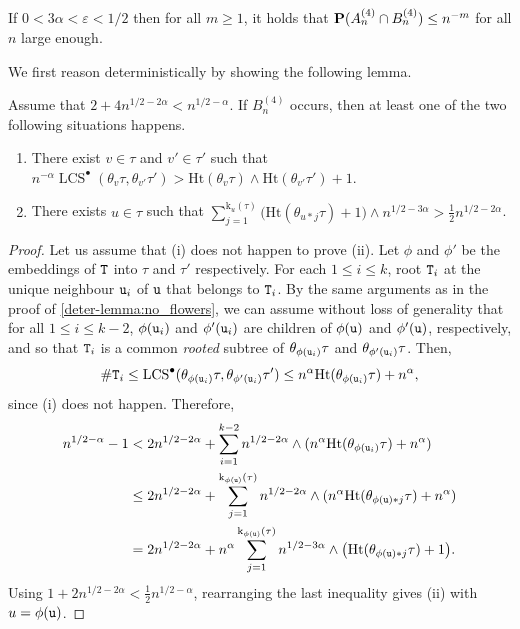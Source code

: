\documentclass[11pt,reqno]{amsart}
\newcommand{\Ht}{\mathrm{Ht}}
\newcommand{\rk}{\mathrm{k}}
\newcommand{\LCS}{\operatorname{LCS}}
\begin{document}
\begin{prop}
\label{prop:no_bushes}
If $0<3\alpha<\varepsilon<1/2$ then for all $m\geq1$, it holds that $\P(A_n^{(4)}\cap B_n^{(4)})\leq n^{-m}$ for all $n$ large enough.
\end{prop}

We first reason deterministically by showing the following lemma.

\begin{lem}
\label{deter-lemma:no_bushes}
Assume that $2+4n^{1/2-2\alpha}<n^{1/2-\alpha}$. If $B_n^{(4)}$ occurs, then at least one of the two following situations happens.
\begin{enumerate}
    \item[\emph{(i)}] There exist $v\in\tau$ and $v'\in\tau'$ such that $n^{-\alpha}\LCS^\bullet(\theta_v\tau,\theta_{v'}\tau')>\Ht(\theta_v\tau)\wedge\Ht(\theta_{v'}\tau')+1$.
    \item[\emph{(ii)}] There exists $u\in\tau$ such that $\sum_{j=1}^{\rk_u(\tau)}\big(\Ht(\theta_{u*j}\tau)+1\big)\wedge n^{1/2-3\alpha}>\tfrac{1}{2}n^{1/2-2\alpha}$.
\end{enumerate}
\end{lem}

\begin{proof}
Let us assume that (i) does not happen to prove (ii). Let $\phi$ and $\phi'$ be the embeddings of $\ttT$ into $\tau$ and $\tau'$ respectively. For each $1\leq i\leq k$, root $\ttT_i$ at the unique neighbour $\ttu_i$ of $\ttu$ that belongs to $\ttT_i$.  By the same arguments as in the proof of \cref{deter-lemma:no_flowers}, we can assume without loss of generality that for all $1\leq i\leq k-2$, $\phi(\ttu_i)$ and $\phi'(\ttu_i)$ are children of $\phi(\ttu)$ and $\phi'(\ttu)$, respectively, and so that $\ttT_i$ is a common \emph{rooted} subtree of $\theta_{\phi(\ttu_i)}\tau$ and $\theta_{\phi'(\ttu_i)}\tau$. Then, \[\#\ttT_i\leq\LCS^\bullet(\theta_{\phi(\ttu_i)}\tau,\theta_{\phi'(\ttu_i)}\tau')\leq n^\alpha \Ht(\theta_{\phi(\ttu_i)}\tau)+n^\alpha,\]
since (i) does not happen. Therefore,
\begin{align*}
n^{1/2-\alpha}-1&<2n^{1/2-2\alpha}+\sum_{i=1}^{k-2}n^{1/2-2\alpha}\wedge (n^\alpha\Ht(\theta_{\phi(\ttu_i)}\tau)+n^\alpha)\\
&\leq 2n^{1/2-2\alpha}+\sum_{j=1}^{\rk_{\phi(\ttu)}(\tau)}n^{1/2-2\alpha}\wedge (n^\alpha\Ht(\theta_{\phi(\ttu)*j}\tau)+n^\alpha)\\
&=2n^{1/2-2\alpha}+n^\alpha\sum_{j=1}^{\rk_{\phi(\ttu)}(\tau)}n^{1/2-3\alpha}\wedge \big(\Ht(\theta_{\phi(\ttu)*j}\tau)+1\big).
\end{align*}
Using $1+2n^{1/2-2\alpha}<\tfrac{1}{2}n^{1/2-\alpha}$, rearranging the last inequality gives (ii) with $u=\phi(\ttu)$.
\end{proof}
\end{document}
